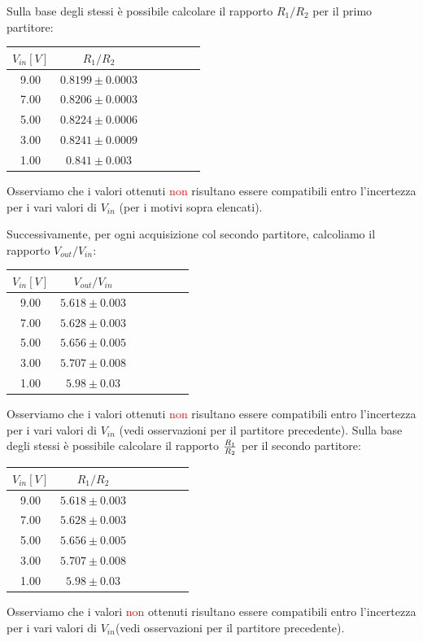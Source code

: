 Sulla base degli stessi è possibile calcolare il rapporto ${R_1}/{R_2}$ per il primo partitore:
\begin{center}
\begin{tabular}{|c|c|c|c|c|c|c|}
\hline
$V_{in} [V]$          & $ {R_1/R_2}$ \\
\hline 
9.00         &    $0.8199 \pm 0.0003$   \\
7.00         &    $0.8206 \pm 0.0003$   \\
5.00         &    $0.8224 \pm 0.0006$   \\
3.00         &    $0.8241 \pm 0.0009$   \\
1.00         &    $0.841 \pm 0.003$   \\
\hline
\end{tabular}
\end{center}
Osserviamo che i valori ottenuti \textcolor{red}{non} risultano essere compatibili entro l'incertezza per i vari valori di $V_{in}$ (per i motivi sopra elencati).

Successivamente, per ogni acquisizione col secondo partitore, calcoliamo il rapporto $V_{out}/V_{in}$:
\begin{center}
\begin{tabular}{|c|c|c|c|c|c|c|}
\hline
$V_{in} [V]$          & $ {V_{out}/V_{in}}$ \\
\hline 
9.00         &    $5.618 \pm 0.003$   \\
7.00         &    $5.628 \pm 0.003$   \\
5.00         &    $5.656 \pm 0.005$   \\
3.00         &    $5.707 \pm 0.008$   \\
1.00         &    $5.98  \pm 0.03$    \\
\hline
\end{tabular}
\end{center}
Osserviamo che i valori ottenuti \textcolor{red}{non} risultano essere compatibili entro l'incertezza per i vari valori di $V_{in}$ (vedi osservazioni per il partitore precedente).
Sulla base degli stessi è possibile calcolare il rapporto ${R_1}\over{R_2}$ per il secondo partitore:
\begin{center}
\begin{tabular}{|c|c|c|c|c|c|c|}
\hline
$V_{in} [V]$          & $ {R_1}/{R_2}$ \\
\hline 
9.00         &    $5.618 \pm 0.003$   \\
7.00         &    $5.628 \pm 0.003$   \\
5.00         &    $5.656 \pm 0.005$   \\
3.00         &    $5.707 \pm 0.008$   \\
1.00         &    $5.98  \pm 0.03$    \\
\hline
\end{tabular}
\end{center}
Osserviamo che i valori \textcolor{red}{non} ottenuti risultano essere compatibili entro l'incertezza per i vari valori di $V_{in}$(vedi osservazioni per il partitore precedente).

